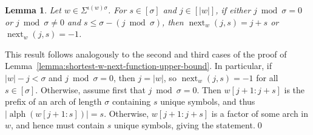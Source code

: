\documentclass[10pt,a4paper]{amsart}
\makeatletter
\DeclareMathOperator{\alphabet}{alph}
\DeclareMathOperator{\nextAlphPos}{next}
\newif\ifpaper
\theoremstyle{plain}
\newtheorem{lemma}{Lemma}
\theoremstyle{definition}
\renewenvironment{proof}[1][\proofname]{\par
  \pushQED{}%
  \normalfont \topsep6\p@\@plus6\p@\relax
  \trivlist
  \item[\hskip\labelsep\itshape #1\@addpunct{.}]\ignorespaces
}{%
  \popQED\endtrivlist\@endpefalse
}
\makeatother
\begin{document}
\fi



\begin{lemma}\label{lemma:shortest-w-next-function-upper-bound-same-arch}
    Let $w\in\Sigma^{\iota(w) \sigma}$.
    For $s\in[\sigma]$ and $j\in[|w|]$, if either $j \bmod \sigma = 0$ or $j \bmod \sigma \neq 0$ and $s \leq \sigma-(j\bmod\sigma)$, then
    $ \nextAlphPos_w(j,s) = j+s$ or $ \nextAlphPos_w(j,s) = -1$.
\end{lemma}
\ifpaper
\else
\begin{proof}
	This result follows analogously to the second and third cases of the proof of Lemma~\ref{lemma:shortest-w-next-function-upper-bound}. In particular, if $|w| - j < \sigma$ and $j \bmod \sigma = 0$, then $j = |w|$, so $\nextAlphPos_w(j,s) = -1$ for all $s\in[\sigma]$. 
	Otherwise, assume first that $j \bmod \sigma = 0$. Then $w[j + 1: j + s]$ is the prefix of an arch of length $\sigma$ containing $s$ unique symbols, and thus $\vert \alphabet(w[j + 1 : s]) \vert = s$. Otherwise, $w[j + 1: j + s]$ is a factor of some arch in $w$, and hence must contain $s$ unique symbols, giving the statement.\qed%
\end{proof}
\fi
\end{document}

